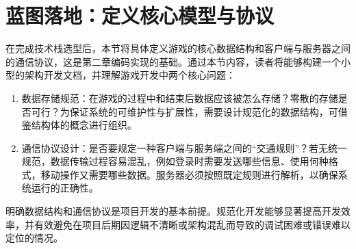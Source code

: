 \section{蓝图落地：定义核心模型与协议}
在完成技术栈选型后，本节将具体定义游戏的核心数据结构和客户端与服务器之间的通信协议，这是第二章编码实现的基础。通过本节内容，读者将能够构建一个小型的架构开发文档，并理解游戏开发中两个核心问题：
\begin{enumerate}
    \item 数据存储规范：在游戏的过程中和结束后数据应该被怎么存储？零散的存储是否可行？为保证系统的可维护性与扩展性，需要设计规范化的数据结构，可借鉴结构体的概念进行组织。
    \item 通信协议设计：是否要规定一种客户端与服务端之间的“交通规则”？若无统一规范，数据传输过程容易混乱，例如登录时需要发送哪些信息、使用何种格式，移动操作又需要哪些数据。服务器必须按照既定规则进行解析，以确保系统运行的正确性。
\end{enumerate}
明确数据结构和通信协议是项目开发的基本前提。规范化开发能够显著提高开发效率，并有效避免在项目后期因逻辑不清晰或架构混乱而导致的调试困难或错误难以定位的情况。
